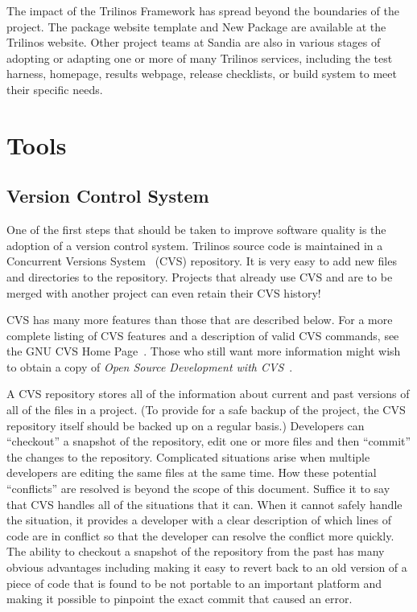 \documentclass[12pt,relax]{article}
\begin{document}
  The impact of the Trilinos Framework has spread beyond the boundaries of 
  the project.  The package website template and New Package are available 
  at the Trilinos website.  Other project teams at Sandia are also in various
  stages of adopting or adapting one or more of many Trilinos services, 
  including the test harness, homepage, results webpage, 
  release checklists, or build system to meet their specific needs.

 


\clearpage


\section{Tools}
\label{Section:Tools}

\subsection{Version Control System}
One of the first steps that should be taken to improve software quality is the 
adoption of a version control system.  Trilinos source code is maintained in a 
Concurrent Versions System~\cite{CVS}
(CVS) repository.  It is very easy to add new files and directories to
the repository.  Projects that already use CVS and are to be merged with 
another project can even retain their CVS history!

CVS has many more features than those that are described below.  For a more 
complete listing of CVS features and a description of valid CVS commands, 
see the GNU CVS Home Page~\cite{CVS}.  Those who still want more information 
might wish to obtain a copy of 
{\it Open Source Development with CVS}~\cite{FogelBarCVS}.

A CVS repository stores all of the information about current and past versions
of all of the files in a project.  (To provide for a safe backup of the 
project, the CVS repository itself should be backed up on a regular basis.)  
Developers can ``checkout'' a snapshot of 
the repository, edit one or more files and then ``commit'' the changes to the
repository.  Complicated situations arise when multiple developers are 
editing the same files at the same time.  How these potential ``conflicts'' 
are resolved is beyond the scope of this document.  Suffice it to say that 
CVS handles all of the situations that it can.  When it cannot safely handle 
the situation, it provides a developer with a clear description of which 
lines of code are in conflict so that the developer can resolve the 
conflict more quickly.  The ability to checkout a snapshot of the 
repository from the past has many obvious advantages including making it easy 
to revert back to an old version of a piece of code that is found to be not 
portable to an important platform and making it possible to pinpoint the exact 
commit that caused an error.
\end{document}
